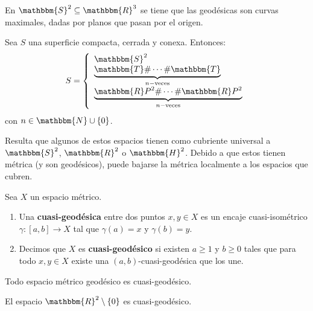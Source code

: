 \documentclass[12pt]{report}
\newcounter{it}
\theoremstyle{largebreak}
\newcommand\cf[3]{\ensuremath{#1:#2\rightarrow#3}}
\newcommand{\bbm}[1]{\ensuremath{\mathbbm{#1}}}
\begin{document}
    \begin{exa}
        En $\bbm{S}^2\subseteq\bbm{R}^3$ se tiene que las geodésicas son curvas maximales, dadas por planos que pasan por el origen.
    \end{exa}

    \begin{theor}
        Sea $S$ una superficie compacta, cerrada y conexa. Entonces:
        \begin{equation*}
            S=\left\{
                \begin{array}{l}
                    \bbm{S}^2 \\
                    \underset{n-\textup{veces}}{\underbrace{\bbm{T}\#\cdots\#\bbm{T}}}\\
                    \underset{n-\textup{veces}}{\underbrace{\bbm{R}P^2\#\cdots\#\bbm{R}P^2}}\\
                \end{array}
            \right.
        \end{equation*}
        con $n\in\bbm{N}\cup\left\{0\right\}$.
    \end{theor}

    Resulta que algunos de estos espacios tienen como cubriente universal a $\bbm{S}^2$, $\bbm{R}^2$ o $\bbm{H}^2$. Debido a que estos tienen métrica (y son geodésicos), puede bajarse la métrica localmente a los espacios que cubren.

    \begin{mydef}
        Sea $X$ un espacio métrico.
        \begin{enumerate}[label = \textit{(\alph*)}]
            \item Una \textbf{cuasi-geodésica} entre dos puntos $x,y\in X$ es un encaje cuasi-isométrico $\cf{\gamma}{[a,b]}{X}$ tal que $\gamma(a)=x$ y $\gamma(b)=y$.
            \item Decimos que $X$ es \textbf{cuasi-geodésico} si existen $a\geq 1$ y $b\geq 0$ tales que para todo $x,y\in X$ existe una $(a,b)$-cuasi-geodésica que los une.
        \end{enumerate}
    \end{mydef}

    \begin{exa}
        Todo espacio métrico geodésico es cuasi-geodésico.
    \end{exa}

    \begin{exa}
        El espacio $\bbm{R}^2\setminus\left\{0\right\}$ es cuasi-geodésico.
    \end{exa}
\end{document}
